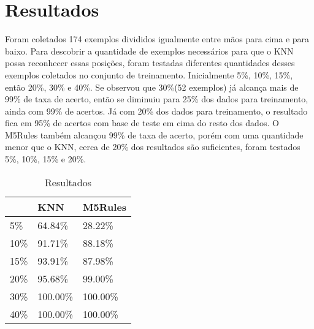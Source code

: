 \section{Resultados}

Foram coletados 174 exemplos divididos igualmente entre mãos para cima e para baixo. Para descobrir a quantidade de exemplos necessários para que o KNN possa reconhecer essas posições, foram testadas diferentes quantidades desses exemplos coletados no conjunto de treinamento. Inicialmente 5\%, 10\%, 15\%, então 20\%, 30\% e 40\%. Se observou que 30\%(52 exemplos) já alcança mais de 99\% de taxa de acerto, então se diminuiu para 25\% dos dados para treinamento, ainda com 99\% de acertos. Já com 20\% dos dados para treinamento, o resultado fica em 95\% de acertos com base de teste em cima do resto dos dados. O M5Rules também alcançou 99\% de taxa de acerto, porém com uma quantidade menor que o KNN, cerca de 20\% dos resultados são suficientes, foram testados 5\%, 10\%, 15\% e 20\%. 

\begin{table}[h]
\centering
\caption{Resultados}
\label{my-label}
\begin{tabular}{|l|l|l|}
\hline	
     & KNN & M5Rules \\
\hline	
5\%  & 64.84\% & 28.22\% \\
\hline	
10\% & 91.71\% & 88.18\% \\
\hline	
15\% & 93.91\% & 87.98\% \\
\hline	
20\% & 95.68\% & 99.00\% \\
\hline	
30\% & 100.00\% & 100.00\% \\
\hline	
40\% & 100.00\% & 100.00\% \\
\hline	
\end{tabular}
\end{table}